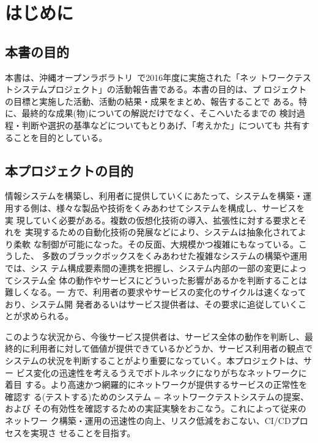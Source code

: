 
\chapter{はじめに}
\label{chap:abstract}

 \section{本書の目的}
 \label{sec:book-purpose}

本書は、沖縄オープンラボラトリ~\cite{ool-web}で2016年度に実施された「ネッ
トワークテストシステムプロジェクト」の活動報告書である。本書の目的は、プ
ロジェクトの目標と実施した活動、活動の結果・成果をまとめ、報告することで
ある。特に、最終的な成果(物)についての解説だけでなく、そこへいたるまでの
検討過程・判断や選択の基準などについてもとりあげ、「考えかた」についても
共有することを目的としている。

 \section{本プロジェクトの目的}
 \label{sec:pj-purpose}


情報システムを構築し、利用者に提供していくにあたって、システムを構築・運
用する側は、様々な製品や技術をくみあわせてシステムを構成し、サービスを実
現していく必要がある。複数の仮想化技術の導入、拡張性に対する要求とそれを
実現するための自動化技術の発展などにより、システムは抽象化されてより柔軟
な制御が可能になった。その反面、大規模かつ複雑にもなっている。こうした、
多数のブラックボックスをくみあわせた複雑なシステムの構築や運用では、シス
テム構成要素間の連携を把握し、システム内部の一部の変更によってシステム全
体の動作やサービスにどういった影響があるかを判断することは難しくなる。一
方で、利用者の要求やサービスの変化のサイクルは速くなっており、システム開
発者あるいはサービス提供者は、その要求に追従していくことが求められる。

このような状況から、今後サービス提供者は、サービス全体の動作を判断し、最
終的に利用者に対して価値が提供できているかどうか、サービス利用者の観点で
システムの状況を判断することがより重要になっていく。本プロジェクトは、サー
ビス変化の迅速性を考えるうえでボトルネックになりがちなネットワークに着目
する。より高速かつ網羅的にネットワークが提供するサービスの正常性を確認す
る(テストする)ためのシステム = ネットワークテストシステムの提案、および
その有効性を確認するための実証実験をおこなう。これによって従来のネットワー
ク構築・運用の迅速性の向上、リスク低減をおこない、CI/CDプロセスを実現さ
せることを目指す。

